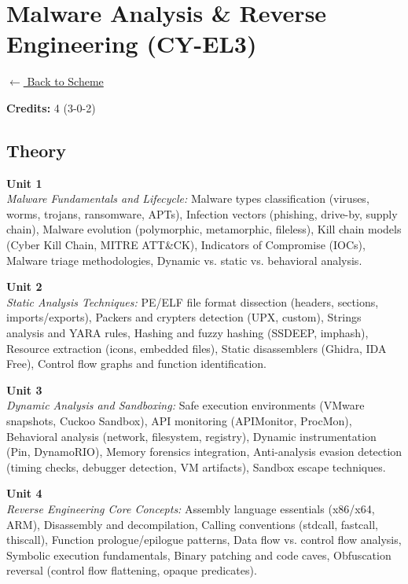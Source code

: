 \section*{Malware Analysis \& Reverse Engineering (CY-EL3)}
\label{elec:CY_3}

\noindent \small{\hyperref[main:scheme]{$\leftarrow$ Back to Scheme}} \vspace{0.5cm}

\noindent \textbf{Credits:} 4 (3-0-2)

\subsection*{Theory}
\noindent\textbf{Unit 1} \\
\textit{Malware Fundamentals and Lifecycle:} Malware types classification (viruses, worms, trojans, ransomware, APTs), Infection vectors (phishing, drive-by, supply chain), Malware evolution (polymorphic, metamorphic, fileless), Kill chain models (Cyber Kill Chain, MITRE ATT\&CK), Indicators of Compromise (IOCs), Malware triage methodologies, Dynamic vs. static vs. behavioral analysis.

\vspace{0.3cm}

\noindent\textbf{Unit 2} \\
\textit{Static Analysis Techniques:} PE/ELF file format dissection (headers, sections, imports/exports), Packers and crypters detection (UPX, custom), Strings analysis and YARA rules, Hashing and fuzzy hashing (SSDEEP, imphash), Resource extraction (icons, embedded files), Static disassemblers (Ghidra, IDA Free), Control flow graphs and function identification.

\vspace{0.3cm}

\noindent\textbf{Unit 3} \\
\textit{Dynamic Analysis and Sandboxing:} Safe execution environments (VMware snapshots, Cuckoo Sandbox), API monitoring (APIMonitor, ProcMon), Behavioral analysis (network, filesystem, registry), Dynamic instrumentation (Pin, DynamoRIO), Memory forensics integration, Anti-analysis evasion detection (timing checks, debugger detection, VM artifacts), Sandbox escape techniques.

\vspace{0.3cm}

\noindent\textbf{Unit 4} \\
\textit{Reverse Engineering Core Concepts:} Assembly language essentials (x86/x64, ARM), Disassembly and decompilation, Calling conventions (stdcall, fastcall, thiscall), Function prologue/epilogue patterns, Data flow vs. control flow analysis, Symbolic execution fundamentals, Binary patching and code caves, Obfuscation reversal (control flow flattening, opaque predicates).

